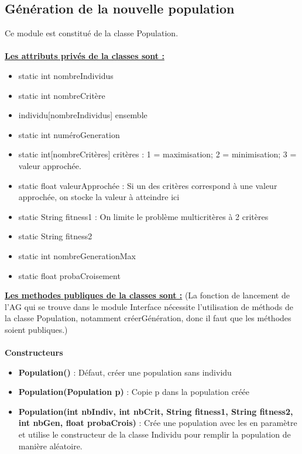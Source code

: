 \documentclass[a4paper,11pt]{article}
\begin{document}
		\subsection{Génération de la nouvelle population}
			Ce module est constitué de la classe Population.\\
			\\
			\underline{\bf Les attributs privés de la classes sont :}\\
				\begin{itemize}
				\item static int nombreIndividus
				\item static int nombreCritère
				\item individu[nombreIndividus] ensemble
				\item static int numéroGeneration
				\item static int[nombreCritères] critères : 1  = maximisation; 2 = minimisation; 3 = valeur approchée.
				\item static float valeurApprochée : Si un des critères correspond à une valeur approchée, on stocke la valeur à atteindre ici
				\item static String fitness1 : On limite le problème multicritères à 2 critères
				\item static String fitness2
				\item static int nombreGenerationMax
				\item static float probaCroisement\\
			\end{itemize}
			\underline{\bf Les methodes publiques de la classes sont :} (La fonction de lancement de l'AG qui se trouve dans le module Interface nécessite l'utilisation de méthods de la classe Population, notamment créerGénération, donc il faut que les méthodes soient publiques.)\\\\
			\textbf{Constructeurs}
						\begin{itemize}
							\item \textbf{Population()} : Défaut, créer une population sans individu
							\item \textbf{Population(Population p)} : Copie p dans la population créée
							\item \textbf{Population(int nbIndiv, int nbCrit, String fitness1, String fitness2, int nbGen, float probaCrois)} : Crée une population avec les en paramètre et utilise le constructeur de la classe Individu pour remplir la population de manière aléatoire. \\
						\end{itemize}
\end{document}
